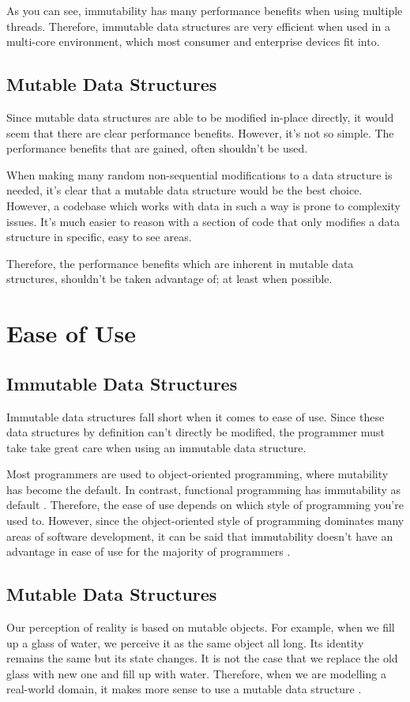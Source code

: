 \documentclass[11pt]{article}
\begin{document}
As you can see, immutability has many performance benefits when using multiple
threads. Therefore, immutable data structures are very efficient when used in a
multi-core environment, which most consumer and enterprise devices fit into.

\subsection{Mutable Data Structures}
Since mutable data structures are able to be modified in-place directly, it
would seem that there are clear performance benefits. However, it's
not so simple. The performance benefits that are gained, often shouldn't be
used.

When making many random non-sequential modifications to a data structure is
needed, it's clear that a mutable data structure would be the best choice.
However, a codebase which works with data in such a way is prone to complexity
issues. It's much easier to reason with a section of code that only modifies a
data structure in specific, easy to see areas.

Therefore, the performance benefits which are inherent in mutable data
structures, shouldn't be taken advantage of; at least when possible.
\clearpage

\section{Ease of Use}
\subsection{Immutable Data Structures}
Immutable data structures fall short when it comes to ease of use. Since these
data structures by definition can't directly be modified, the programmer must
take take great care when using an immutable data structure.

Most programmers are used to object-oriented programming, where mutability has
become the default. In contrast, functional programming has immutability as
default \cite{miles}. Therefore, the ease of use depends on which style of
programming you're used to. However, since the object-oriented style of
programming dominates many areas of software development, it can be said that
immutability doesn't have an advantage in ease of use for the majority of
programmers \cite{ieee_spectrum}.

\subsection{Mutable Data Structures}
Our perception of reality is based on mutable objects. For example, when we
fill up a glass of water, we perceive it as the same object all long. Its
identity remains the same but its state changes. It is not the case that we
replace the old glass with new one and fill up with water. Therefore, when we
are modelling a real-world domain, it makes more sense to use a mutable data
structure \cite{peter_toro}.
\end{document}
